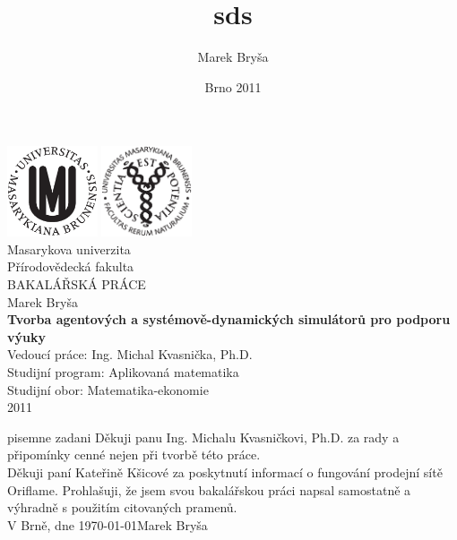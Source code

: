 \documentclass[a4wide,12pt]{report}
\title{sds}
\author{Marek Bryša}
\date{Brno 2011}
\begin{document}
\thispagestyle{empty}
\pagebreak
\mbox{}%
\vfill

\begin{center}
\includegraphics[width=0.2\textwidth]{./znak_MU_cerny.eps}\hspace{2cm}
\includegraphics[width=0.2\textwidth]{./znak_PrF_cerny.eps}\\[1cm]    

{\LARGE Masarykova univerzita}\\[0.5cm]
{\LARGE Přírodovědecká fakulta}\\[0.5cm]
{\LARGE BAKALÁŘSKÁ PRÁCE}\\[0.7cm]
{\LARGE Marek Bryša}\\[0.5cm]
{ \huge \bfseries Tvorba agentových a systémově-dynamických simulátorů pro podporu výuky}\\[0.4cm]
{\large Vedoucí práce: Ing. Michal Kvasnička, Ph.D.}\\[0.5cm]
{\large Studijní program: Aplikovaná matematika}\\[0.2cm]
{\large Studijní obor: Matematika-ekonomie}\\[0.5cm]
{\large 2011}\\
\vspace{5cm}

\vfill
\pagebreak

\end{center}

\newpage
\thispagestyle{empty}
pisemne zadani
\newpage
\thispagestyle{empty}
\vspace{2cm}
\noindent
Děkuji panu Ing. Michalu Kvasničkovi, Ph.D. za rady a připomínky cenné nejen při tvorbě této práce.\\
Děkuji paní Kateřině Kšicové za poskytnutí informací o fungování prodejní sítě Oriflame.
\vfill
\noindent
Prohlašuji, že jsem svou bakalářskou práci napsal samostatně a výhradně s použitím citovaných pramenů.\\[3cm]
V Brně, dne \today \hfill Marek Bryša\hspace{3cm}
\vspace{1.5cm}
\newpage
\newpage
\thispagestyle{empty}
\end{document}
